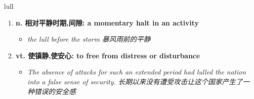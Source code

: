 
\begin{frame}
{\huge lull}
\begin{center}
\begin{enumerate}\Large
  \item \textbf{n. 相对平静时期,间隙: a momentary halt in an activity}
  \begin{itemize}
    \item \em{\Large{the lull before the storm 暴风雨前的平静}}
  \end{itemize}
  \item \textbf{vt. 使镇静,使安心: to free from distress or disturbance}
  \begin{itemize}
    \item \em{\Large{The absence of attacks for such an extended period had lulled the nation into a false sense of security. 长期以来没有遭受攻击让这个国家产生了一种错误的安全感}}
  \end{itemize}
\end{enumerate}
\end{center}
\end{frame}
